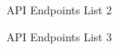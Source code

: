 \begin{figure}[H]
    \centering
    \caption{API Endpoints List 2}
    \label{fig:api2}
\end{figure}
\begin{figure}[H]
    \centering
    \caption{API Endpoints List 3}
    \label{fig:api3}
\end{figure}